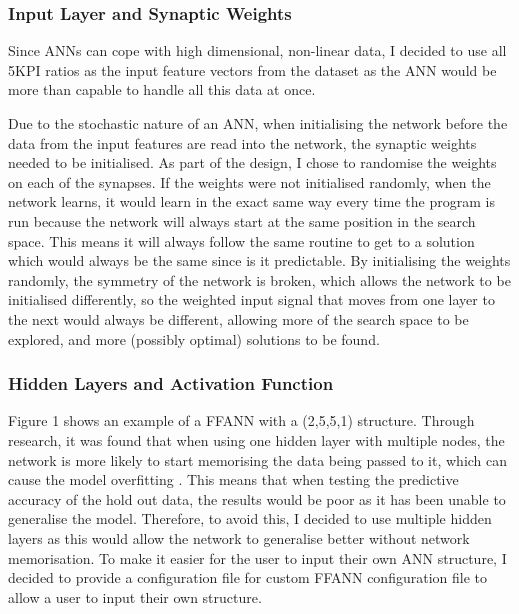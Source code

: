 \documentclass[11pt]{article}
\begin{document}
\subsubsection{Input Layer and Synaptic Weights}\label{subsubsec:inputLayer}
Since ANNs can cope with high dimensional, non-linear data, I decided to use all 5KPI ratios as the input feature vectors from the dataset as the ANN would be more than capable to handle all this data at once.

Due to the stochastic nature of an ANN, when initialising the network before the data from the input features are read into the network, the synaptic weights needed to be initialised. As part of the design, I chose to randomise the weights on each of the synapses. If the weights were not initialised randomly, when the network learns, it would learn in the exact same way every time the program is run because the network will always start at the same position in the search space. This means it will always follow the same routine to get to a solution which would always be the same since is it predictable.  By initialising the weights randomly, the symmetry of the network is broken, which allows the network to be initialised differently, so the weighted input signal that moves from one layer to the next would always be different, allowing more of the search space to be explored, and more (possibly optimal) solutions to be found.
\subsubsection{Hidden Layers and Activation Function}\label{subsubsec:hiddenL}%
Figure 1 shows an example of a FFANN with a (2,5,5,1) structure. Through research, it was found that when using one hidden layer with multiple nodes, the network is more likely to start memorising the data being passed to it, which can cause the model overfitting %
\cite{ref-one}. This means that when testing the predictive accuracy of the hold out data, the results would be poor as it has been unable to generalise the model. Therefore, to avoid this, I decided to use multiple hidden layers as this would allow the network to generalise better without network memorisation.  To make it easier for the user to input their own ANN structure, I decided to provide a configuration file for custom FFANN configuration file to allow a user to input their own structure. 
\end{document}
